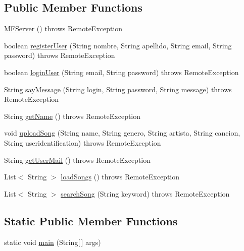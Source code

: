 \subsection*{Public Member Functions}
\begin{DoxyCompactItemize}
\item 
\hyperlink{classes_1_1deusto_1_1spq_1_1server_1_1_m_f_server_ad42bf68ba9cfc4b560e212df32009cb2}{M\+F\+Server} ()  throws Remote\+Exception 
\item 
boolean \hyperlink{classes_1_1deusto_1_1spq_1_1server_1_1_m_f_server_abf0e32da4f876c11c864593f5d7e39f2}{register\+User} (String nombre, String apellido, String email, String password)  throws Remote\+Exception 
\item 
boolean \hyperlink{classes_1_1deusto_1_1spq_1_1server_1_1_m_f_server_ad242cbf142dbea245a4be10f52b16745}{login\+User} (String email, String password)  throws Remote\+Exception 
\item 
String \hyperlink{classes_1_1deusto_1_1spq_1_1server_1_1_m_f_server_a8d8a50dc58a3b1bd821b95fd30f64af5}{say\+Message} (String login, String password, String message)  throws Remote\+Exception 
\item 
String \hyperlink{classes_1_1deusto_1_1spq_1_1server_1_1_m_f_server_a75eaf5cc57e286889d322248a83a9418}{get\+Name} ()  throws Remote\+Exception 
\item 
void \hyperlink{classes_1_1deusto_1_1spq_1_1server_1_1_m_f_server_a6bd9178166f1294c83144ee792b15cf3}{upload\+Song} (String name, String genero, String artista, String cancion, String useridentification)  throws Remote\+Exception 
\item 
String \hyperlink{classes_1_1deusto_1_1spq_1_1server_1_1_m_f_server_a01d5a6424526e32d8e8ace58776ccad4}{get\+User\+Mail} ()  throws Remote\+Exception 
\item 
List$<$ String $>$ \hyperlink{classes_1_1deusto_1_1spq_1_1server_1_1_m_f_server_ae2c8a121696577c33472b1bad368a1df}{load\+Songs} ()  throws Remote\+Exception 
\item 
List$<$ String $>$ \hyperlink{classes_1_1deusto_1_1spq_1_1server_1_1_m_f_server_ac317c84d14b002d8446046df9345c7ab}{search\+Song} (String keyword)  throws Remote\+Exception 
\end{DoxyCompactItemize}
\subsection*{Static Public Member Functions}
\begin{DoxyCompactItemize}
\item 
static void \hyperlink{classes_1_1deusto_1_1spq_1_1server_1_1_m_f_server_a9cacd13c2c31532f09e0825396a8176d}{main} (String\mbox{[}$\,$\mbox{]} args)
\end{DoxyCompactItemize}


